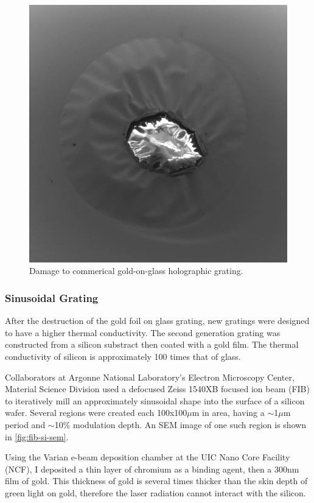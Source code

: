 \begin{figure}
  \centering
  \includegraphics{damage.png}
  \caption{Damage to commerical gold-on-glass holographic grating.}
  \label{fig:grating-damage}
\end{figure}

\subsubsection{Sinusoidal Grating}

After the destruction of the gold foil on glass grating, new gratings were designed to have a higher thermal conductivity.
The second generation grating was constructed from a silicon substract then coated with a gold film.
The thermal conductivity of silicon is approximately 100 times that of glass. %

Collaborators at Argonne National Laboratory's Electron Microscopy Center, Material Science Division used a defocused Zeiss 1540XB focused ion beam (FIB) to iteratively mill an approximately sinusoidal shape into the surface of a silicon wafer.
Several regions were created each 100x100$\mu$m in area, having a $\sim$1$\mu$m period and $\sim$10\% modulation depth.
An SEM image of one such region is shown in \ref{fig:fib-si-sem}.

Using the Varian e-beam deposition chamber at the UIC Nano Core Facility (NCF), I deposited a thin layer of chromium as a binding agent, then a 300nm film of gold.
This thickness of gold is several times thicker than the skin depth of green light on gold, therefore the laser radiation cannot interact with the silicon.


